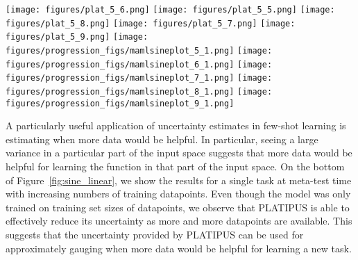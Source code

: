 \documentclass{article}
\begin{document}
\begin{figure*}[t] \centering
\texttt{[image: figures/plat\_5\_6.png]}
    \texttt{[image: figures/plat\_5\_5.png]}
    \texttt{[image: figures/plat\_5\_8.png]}
    \texttt{[image: figures/plat\_5\_7.png]}
    \texttt{[image: figures/plat\_5\_9.png]}
    \texttt{[image: figures/progression\_figs/mamlsineplot\_5\_1.png]}
    \texttt{[image: figures/progression\_figs/mamlsineplot\_6\_1.png]}
    \texttt{[image: figures/progression\_figs/mamlsineplot\_7\_1.png]}
    \texttt{[image: figures/progression\_figs/mamlsineplot\_8\_1.png]}
    \texttt{[image: figures/progression\_figs/mamlsineplot\_9\_1.png]}
    \vspace{-0.2cm}
    \caption{\small Samples from PLATIPUS trained for 5-shot regression, shown as colored dotted lines. The tasks consist of regressing to sinusoid and linear functions, shown in gray. MAML, shown in black, is a deterministic procedure and hence learns a single function, rather than reasoning about the distribution over potential functions. As seen on the bottom row, even though PLATIPUS is trained for 5-shot regression, it can effectively reason over its uncertainty when provided variable numbers of datapoints at test time (left vs. right).
    \label{fig:sine_linear} }
    \vspace{-0.4cm}
\end{figure*}

A particularly useful application of uncertainty estimates in few-shot learning is estimating when more data would be helpful. In particular, seeing a large variance in a particular part of the input space suggests that more data would be helpful for learning the function in that part of the input space. On the bottom of Figure~\ref{fig:sine_linear}, we show the results for a single task at meta-test time with increasing numbers of training datapoints. Even though the model was only trained on training set sizes of  datapoints, we observe that PLATIPUS is able to effectively reduce its uncertainty as more and more datapoints are available. This suggests that the uncertainty provided by PLATIPUS can be used for approximately gauging when more data would be helpful for learning a new task. 
\end{document}
